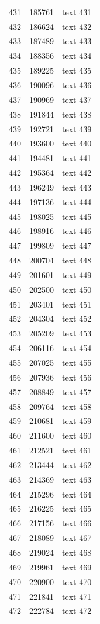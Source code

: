 \documentclass[10pt]{article}
\begin{document}
\begin{longtable}{rrl}
431&185761&text 431\\
432&186624&text 432\\
433&187489&text 433\\
434&188356&text 434\\
435&189225&text 435\\
436&190096&text 436\\
437&190969&text 437\\
438&191844&text 438\\
439&192721&text 439\\
440&193600&text 440\\
441&194481&text 441\\
442&195364&text 442\\
443&196249&text 443\\
444&197136&text 444\\
445&198025&text 445\\
446&198916&text 446\\
447&199809&text 447\\
448&200704&text 448\\
449&201601&text 449\\
450&202500&text 450\\
451&203401&text 451\\
452&204304&text 452\\
453&205209&text 453\\
454&206116&text 454\\
455&207025&text 455\\
456&207936&text 456\\
457&208849&text 457\\
458&209764&text 458\\
459&210681&text 459\\
460&211600&text 460\\
461&212521&text 461\\
462&213444&text 462\\
463&214369&text 463\\
464&215296&text 464\\
465&216225&text 465\\
466&217156&text 466\\
467&218089&text 467\\
468&219024&text 468\\
469&219961&text 469\\
470&220900&text 470\\
471&221841&text 471\\
472&222784&text 472\\

\end{longtable}
\end{document}

